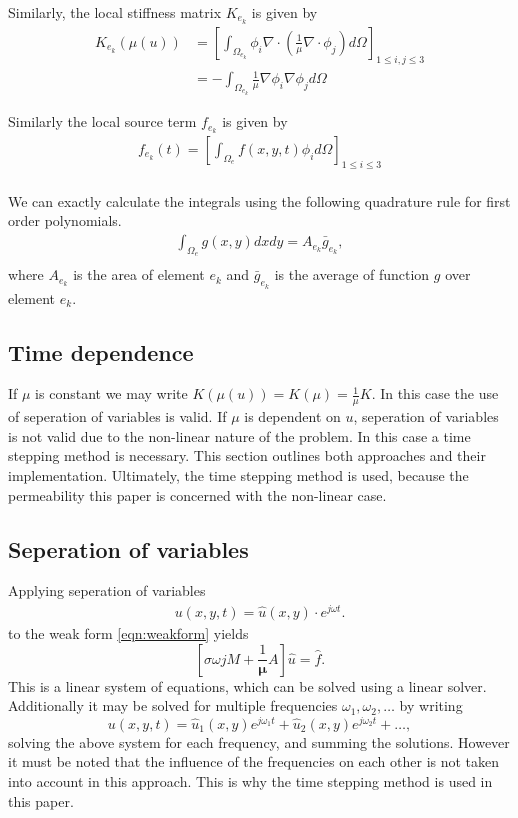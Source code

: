 \noindent Similarly, the local stiffness matrix $K_{e_k}$ is given by
\begin{align*}
    K_{e_k}(\mu(u)) &= \left[\int_{\Omega_{e_k}} \phi_i \nabla \cdot \left(\frac{1}{\mu} \nabla \cdot \phi_j \right) d \Omega \right]_{1 \leq i, j \leq 3} \\
    &= -\int_{\Omega_{e_k}} \frac{1}{\mu} \nabla \phi_i \nabla \phi_j d \Omega
\end{align*}

\noindent Similarly the local source term $f_{e_k}$ is given by
\begin{align*}
    f_{e_k}(t) = \left[\int_{\Omega_e} f(x,y,t) \phi_i d \Omega\right]_{1 \leq i \leq 3}\\
\end{align*}

\noindent We can exactly calculate the integrals using the following quadrature rule for first order polynomials.
\begin{align*}
    \int_{\Omega_e}g(x,y)dxdy = A_{e_k}\bar{g}_{e_k}, \\
\end{align*}
where $A_{e_k}$ is the area of element $e_k$ and $\bar{g}_{e_k}$ is the average of function $g$ over element $e_k$.

\subsection{Time dependence}
If $\mu$ is constant we may write $K(\mu(u)) = K(\mu) = \frac{1}{\mu}K$. In this case the use of seperation of variables is valid. 
If $\mu$ is dependent on $u$, seperation of variables is not valid due to the non-linear nature of the problem. 
In this case a time stepping method is necessary. This section outlines both approaches and their implementation.
Ultimately, the time stepping method is used, because the permeability this paper is concerned with the non-linear case.

\subsection{Seperation of variables}
Applying seperation of variables
\begin{align*}
    u(x,y,t) = \hat u(x,y) \cdot e^{j\omega t}.
\end{align*}
to the weak form \eqref{eqn:weakform} yields
\begin{equation*}
    \left[\sigma \omega j M + \frac{1}{\mathbf \mu}A\right]\hat u = \hat f.
\end{equation*}
This is a linear system of equations, which can be solved using a linear solver. 
Additionally it may be solved for multiple frequencies $\omega_1, \omega_2, \dots$ by writing
\begin{equation}
    u(x,y,t) = \hat u_1(x,y) e^{j\omega_1 t} + \hat u_2(x,y) e^{j\omega_2 t} + \dots,
\end{equation}
solving the above system for each frequency, and summing the solutions. However it must be noted that the influence of the frequencies on each other is not taken into account in this approach.
This is why the time stepping method is used in this paper.

